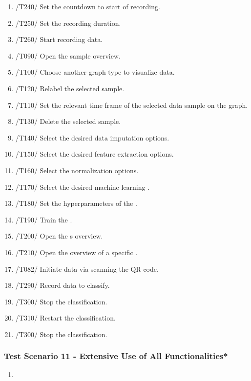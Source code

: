 \begin{enumerate}
    \item /T240/ Set the countdown to start of recording.
    \item /T250/ Set the recording duration.
    \item /T260/ Start recording data.
    \item /T090/ Open the sample overview.
    \item /T100/ Choose another graph type to visualize data.
    \item /T120/ Relabel the selected sample.
    \item /T110/ Set the relevant time frame of the selected \gls{data sample} on the graph.
    \item /T130/ Delete the selected sample.
    \item /T140/ Select the desired data imputation options.
    \item /T150/ Select the desired \gls{feature extraction} options.
    \item /T160/ Select the normalization options.
    \item /T170/ Select the desired machine learning .
    \item /T180/ Set the hyperparameters of the .
    \item /T190/ Train the .
    \item /T200/ Open the s overview. 
    \item /T210/ Open the overview of a specific .
    \item /T082/ Initiate data via scanning the \gls{QR code}.
    \item /T290/ Record data to classify. 
    \item /T300/ Stop the \gls{classification}.
    \item /T310/ Restart the \gls{classification}.
    \item /T300/ Stop the \gls{classification}.
\end{enumerate}

\subsubsection{Test Scenario 11 - Extensive Use of All Functionalities*}
\begin{enumerate}
    \item 
\end{enumerate}
